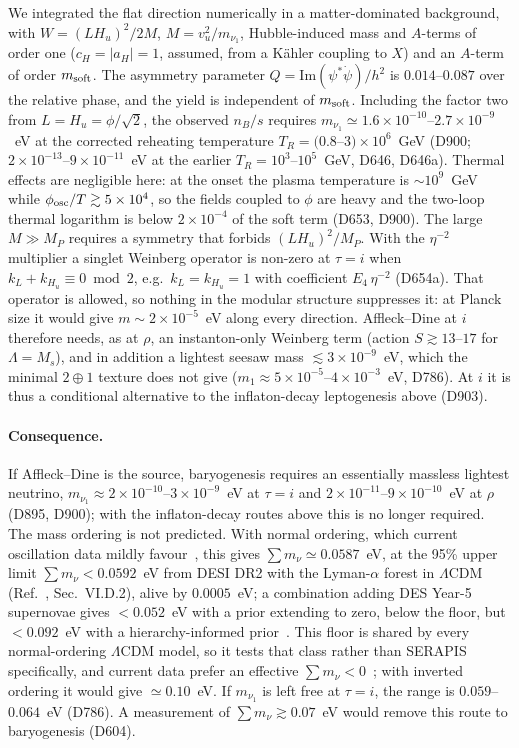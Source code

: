 \documentclass[aps,prd,twocolumn,superscriptaddress,nofootinbib,floatfix]{revtex4-2}
\begin{document}
We integrated the flat direction numerically in a matter-dominated background, with $W=(LH_u)^2/2M$, $M=v_u^2/m_{\nu_1}$, Hubble-induced mass and $A$-terms of order one ($c_H=|a_H|=1$, assumed, from a Kähler coupling to $X$) and an $A$-term of order $m_{\rm soft}$. The asymmetry parameter $Q=\mathrm{Im}(\psi^*\dot\psi)/h^2$ is $0.014$--$0.087$ over the relative phase, and the yield is independent of $m_{\rm soft}$. Including the factor two from $L=H_u=\phi/\sqrt2$, the observed $n_B/s$ requires $m_{\nu_1}\simeq1.6\times10^{-10}$--$2.7\times10^{-9}$~eV at the corrected reheating temperature $T_R=(0.8$--$3)\times10^6$~GeV (D900; $2\times10^{-13}$--$9\times10^{-11}$~eV at the earlier $T_R=10^3$--$10^5$~GeV, D646, D646a). Thermal effects are negligible here: at the onset the plasma temperature is $\sim10^9$~GeV while $\phi_{\rm osc}/T\gtrsim5\times10^4$, so the fields coupled to $\phi$ are heavy and the two-loop thermal logarithm is below $2\times10^{-4}$ of the soft term (D653, D900). The large $M\gg M_P$ requires a symmetry that forbids $(LH_u)^2/M_P$. With the $\eta^{-2}$ multiplier a singlet Weinberg operator is non-zero at $\tau=i$ when $k_L+k_{H_u}\equiv0\bmod2$, e.g.\ $k_L=k_{H_u}=1$ with coefficient $E_4\,\eta^{-2}$ (D654a). That operator is allowed, so nothing in the modular structure suppresses it: at Planck size it would give $m\sim2\times10^{-5}$~eV along every direction. Affleck--Dine at $i$ therefore needs, as at $\rho$, an instanton-only Weinberg term (action $S\gtrsim13$--$17$ for $\Lambda=M_s$), and in addition a lightest seesaw mass $\lesssim3\times10^{-9}$~eV, which the minimal $2\oplus1$ texture does not give ($m_1\approx5\times10^{-5}$--$4\times10^{-3}$~eV, D786). At $i$ it is thus a conditional alternative to the inflaton-decay leptogenesis above (D903).

\paragraph{Consequence.} If Affleck--Dine is the source, baryogenesis requires an essentially massless lightest neutrino, $m_{\nu_1}\approx2\times10^{-10}$--$3\times10^{-9}$~eV at $\tau=i$ and $2\times10^{-11}$--$9\times10^{-10}$~eV at $\rho$ (D895, D900); with the inflaton-decay routes above this is no longer required. The mass ordering is not predicted. With normal ordering, which current oscillation data mildly favour~\cite{arXiv_2410_05380}, this gives $\sum m_\nu\simeq0.0587$~eV, at the 95\% upper limit $\sum m_\nu < 0.0592$~eV from DESI DR2 with the Lyman-$\alpha$ forest in $\Lambda$CDM (Ref.~\cite{arXiv_2607_27410}, Sec.~VI.D.2), alive by $0.0005$~eV; a combination adding DES Year-5 supernovae gives $<0.052$~eV with a prior extending to zero, below the floor, but $<0.092$~eV with a hierarchy-informed prior~\cite{arXiv_2606_17994}. This floor is shared by every normal-ordering $\Lambda$CDM model, so it tests that class rather than SERAPIS specifically, and current data prefer an effective $\sum m_\nu<0$~\cite{arXiv_2610_20977}; with inverted ordering it would give $\simeq0.10$~eV. If $m_{\nu_1}$ is left free at $\tau=i$, the range is $0.059$--$0.064$~eV (D786). A measurement of $\sum m_\nu \gtrsim 0.07$~eV would remove this route to baryogenesis (D604).
\end{document}

